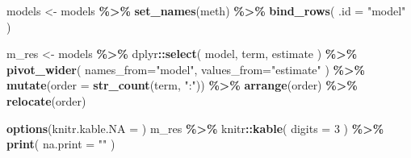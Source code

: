 \documentclass[
]{book}
\newenvironment{Shaded}{\begin{snugshade}}{\end{snugshade}}
\newcommand{\AttributeTok}[1]{\textcolor[rgb]{0.13,0.29,0.53}{#1}}
\newcommand{\DecValTok}[1]{\textcolor[rgb]{0.00,0.00,0.81}{#1}}
\newcommand{\FunctionTok}[1]{\textcolor[rgb]{0.13,0.29,0.53}{\textbf{#1}}}
\newcommand{\NormalTok}[1]{#1}
\newcommand{\OtherTok}[1]{\textcolor[rgb]{0.56,0.35,0.01}{#1}}
\newcommand{\SpecialCharTok}[1]{\textcolor[rgb]{0.81,0.36,0.00}{\textbf{#1}}}
\newcommand{\StringTok}[1]{\textcolor[rgb]{0.31,0.60,0.02}{#1}}
\begin{document}
\begin{Shaded}
\begin{Highlighting}[]
\NormalTok{models }\OtherTok{\textless{}{-}} 
\NormalTok{  models }\SpecialCharTok{\%\textgreater{}\%} 
  \FunctionTok{set\_names}\NormalTok{(meth) }\SpecialCharTok{\%\textgreater{}\%} 
  \FunctionTok{bind\_rows}\NormalTok{( }\AttributeTok{.id =} \StringTok{"model"}\NormalTok{ )}

\NormalTok{m\_res }\OtherTok{\textless{}{-}}\NormalTok{ models }\SpecialCharTok{\%\textgreater{}\%} 
\NormalTok{  dplyr}\SpecialCharTok{::}\FunctionTok{select}\NormalTok{( model, term, estimate ) }\SpecialCharTok{\%\textgreater{}\%}
  \FunctionTok{pivot\_wider}\NormalTok{( }\AttributeTok{names\_from=}\StringTok{"model"}\NormalTok{, }\AttributeTok{values\_from=}\StringTok{"estimate"}\NormalTok{ ) }\SpecialCharTok{\%\textgreater{}\%}
  \FunctionTok{mutate}\NormalTok{(}\AttributeTok{order =} \FunctionTok{str\_count}\NormalTok{(term, }\StringTok{":"}\NormalTok{)) }\SpecialCharTok{\%\textgreater{}\%}
  \FunctionTok{arrange}\NormalTok{(order) }\SpecialCharTok{\%\textgreater{}\%}
  \FunctionTok{relocate}\NormalTok{(order)}

\FunctionTok{options}\NormalTok{(}\AttributeTok{knitr.kable.NA =} \StringTok{\textquotesingle{}\textquotesingle{}}\NormalTok{)}
\NormalTok{m\_res }\SpecialCharTok{\%\textgreater{}\%}
\NormalTok{  knitr}\SpecialCharTok{::}\FunctionTok{kable}\NormalTok{( }\AttributeTok{digits =} \DecValTok{3}\NormalTok{ ) }\SpecialCharTok{\%\textgreater{}\%}
  \FunctionTok{print}\NormalTok{( }\AttributeTok{na.print =} \StringTok{""}\NormalTok{ )}
\end{Highlighting}
\end{Shaded}
\end{document}
